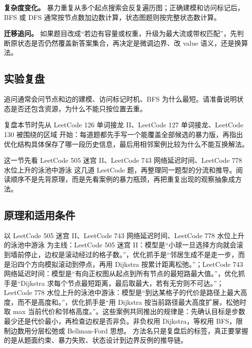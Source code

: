 \textbf{复杂度变化。} 暴力重复从多个起点搜索会反复遍历图；正确建模和访问标记后，BFS 或 DFS 通常按节点数加边数计算，状态图题则按完整状态数计算。

\textbf{迁移追问。} 如果题目改成“若边有容量或权重，升级为最大流或带权匹配”，先判断原状态是否仍然覆盖新答案集合，再决定是微调边界、改 value 语义，还是换算法。

\subsection{实验复盘}

追问通常会问节点和边的建模、访问标记时机、BFS 为什么最短。请准备说明状态是否还包含资源，为什么不能只按位置去重。

复盘本节时先从 LeetCode 126 单词接龙 II、LeetCode 127 单词接龙、LeetCode 130 被围绕的区域 开始：每道题都先手写一个能覆盖全部候选的暴力版，再指出优化结构具体保存了哪一段历史信息，最后用相邻案例比较为什么不能互换解法。

这一节先看 LeetCode 505 迷宫 II、LeetCode 743 网络延迟时间、LeetCode 778 水位上升的泳池中游泳 这几道 LeetCode 题，再整理同一题型的分流和推导。阅读顺序不是先背原理，而是先看案例的暴力瓶颈，再把重复出现的观察抽象成方法。

\subsection{原理和适用条件}

以 LeetCode 505 迷宫 II、LeetCode 743 网络延迟时间、LeetCode 778 水位上升的泳池中游泳 为主线：LeetCode 505 迷宫 II：模型是“小球一旦选择方向就会滚到墙前停止，边权是滚动经过的格子数。”，优化抓手是“邻居生成不是走一步，而是沿四个方向模拟滚动到停点，再用 Dijkstra 按累计距离松弛。”；LeetCode 743 网络延迟时间：模型是“有向正权图从起点到所有节点的最短路最大值。”，优化抓手是“Dijkstra 求每个节点最短距离，最后取最大，若有无穷则不可达。”；LeetCode 778 水位上升的泳池中游泳：模型是“到达某格子的代价是路径上最大高度，而不是高度和。”，优化抓手是“用 Dijkstra 按当前路径最大高度扩展，松弛时取 max 当前代价和邻格高度。”。这些案例共同推出的规律是：先确认目标是步数最少还是代价最小，再检查边权是否非负。非负权用 Dijkstra，等权用 BFS，限制边数用分层松弛或 Bellman-Ford 思想。 方法名只是复盘后的标签，真正要掌握的是从题面约束、暴力失败、状态设计到边界反例的推导链。

